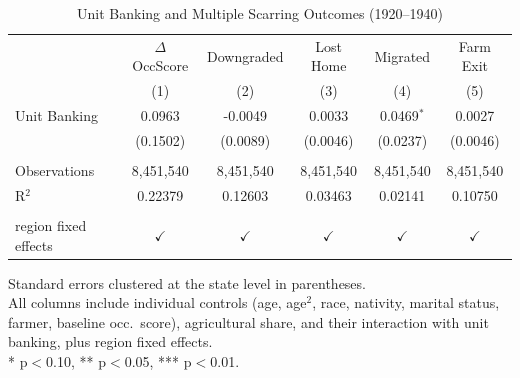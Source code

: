 
\begin{table}[htbp]
   \caption{\label{tab:outcomes} Unit Banking and Multiple Scarring Outcomes (1920--1940)}
   \bigskip
   \centering
   \begin{tabular}{lccccc}
      \toprule
                           & $\Delta$ OccScore & Downgraded & Lost Home & Migrated & Farm Exit \\
                           & (1)               & (2)        & (3)       & (4)      & (5)\\
      \midrule
      Unit Banking         & 0.0963            & -0.0049    & 0.0033    & 0.0469$^{*}$ & 0.0027\\
                           & (0.1502)          & (0.0089)   & (0.0046)  & (0.0237)     & (0.0046)\\
       \\
      Observations         & 8,451,540         & 8,451,540  & 8,451,540 & 8,451,540    & 8,451,540\\
      R$^2$                & 0.22379           & 0.12603    & 0.03463   & 0.02141      & 0.10750\\
       \\
      region fixed effects & $\checkmark$      & $\checkmark$ & $\checkmark$ & $\checkmark$ & $\checkmark$\\
      \bottomrule
   \end{tabular}

   \par \raggedright
   Standard errors clustered at the state level in parentheses.\\
   All columns include individual controls (age, age$^2$, race, nativity, marital status, farmer, baseline occ.\ score), agricultural share, and their interaction with unit banking, plus region fixed effects.\\
   * p$<$0.10, ** p$<$0.05, *** p$<$0.01.
\end{table}

